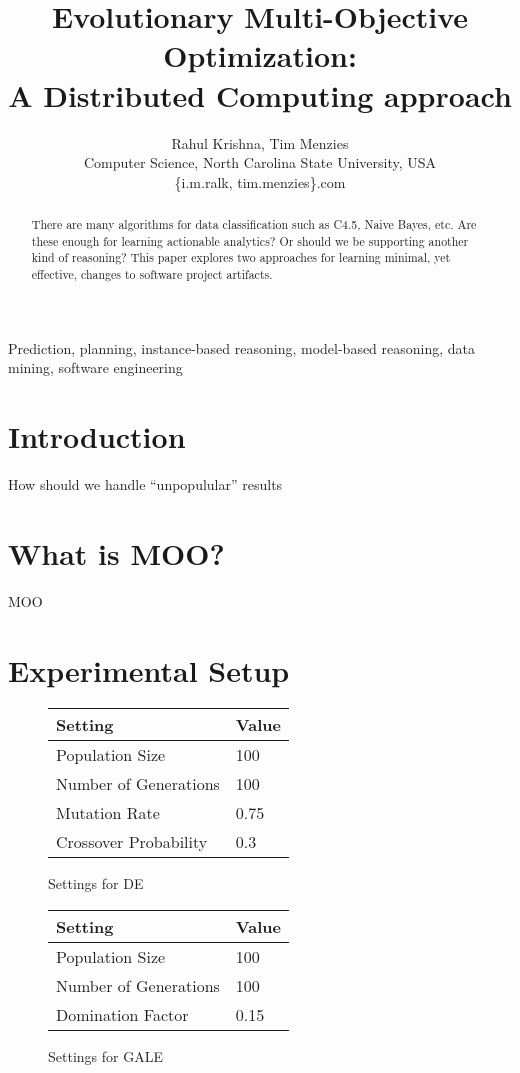 \documentclass[conference]{IEEEtran}
\author{Rahul Krishna, Tim Menzies\\
	Computer Science, North Carolina State University, USA\\
	\{i.m.ralk, tim.menzies\}\@gmail.com
}
\title{Evolutionary Multi-Objective Optimization:\\ A Distributed Computing approach}
\begin{document}
	\maketitle
	\begin{abstract}
There are many algorithms for data  classification such as  C4.5, Naive Bayes, etc. Are these enough for learning actionable analytics? Or should we be supporting another kind of reasoning? This paper explores two approaches for learning minimal, yet effective, changes to software project artifacts.
	\end{abstract}
	\begin{IEEEkeywords}
		Prediction, planning, instance-based reasoning, model-based reasoning, data mining, software engineering
	\end{IEEEkeywords}
	
	\section{Introduction} 
	How should we handle ``unpopulular'' results

\section{What is MOO?}
MOO

\section{Experimental Setup}

\begin{figure}
\centering
\begin{tabular}{|l@{~}|l@{~}|}
\hline
Setting & Value \\ \hline
Population Size               & 100   \\
Number of Generations         & 100   \\
Mutation Rate                 & 0.75  \\ 
Crossover Probability         & 0.3  \\ \hline
\end{tabular}
\caption{Settings for DE}
\label{fig:de_settings}
\end{figure}

\begin{figure}
\centering
\begin{tabular}{|l@{~}|l@{~}|}
\hline
Setting & Value \\ \hline
Population Size               & 100   \\
Number of Generations         & 100   \\
Domination Factor             & 0.15  \\ \hline 
\end{tabular}
\caption{Settings for GALE}
\label{fig:gale_settings}
\end{figure}
\end{document}
